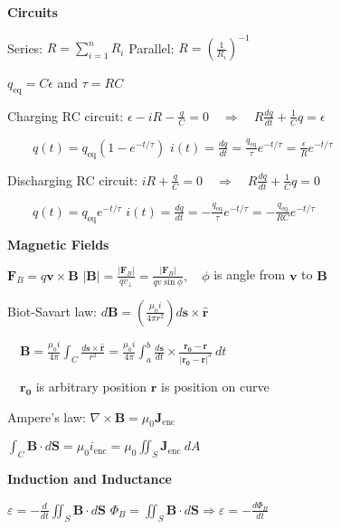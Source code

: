 \documentclass[twocolumn]{article}
\begin{document}
\textbf{Circuits}

Series: $R = \sum_{i=1}^n R_i$ \hfill Parallel: $R = \left( \frac{1}{R_i} \right)^{-1}$

$q_{\text{eq}} = C \epsilon$ and $\tau = RC$

Charging RC circuit: $\epsilon - iR - \frac{q}{C} = 0 \hspace{1em} \Longrightarrow \hspace{1em} R \frac{dq}{dt} + \frac{1}{C} q = \epsilon$

$\quad\quad q(t) = q_{\text{eq}} (1-e^{-t/\tau})$ \hfill $i(t) = \frac{dq}{dt} = \frac{q_{\text{eq}}}{\tau} e^{-t/\tau} = \frac{\epsilon}{R} e^{-t/\tau}$

Discharging RC circuit: $iR + \frac{q}{C} = 0 \hspace{1em} \Longrightarrow \hspace{1em} R \frac{dq}{dt} + \frac{1}{C} q = 0$

$\quad\quad q(t) = q_{\text{eq}} e^{-t/\tau}$ \hfill $i(t) = \frac{dq}{dt} = -\frac{q_{\text{eq}}}{\tau} e^{-t/\tau} = -\frac{q_{\text{eq}}}{RC} e^{-t/\tau}$

\dotfill

\textbf{Magnetic Fields}

$\mathbf{F}_B = q \mathbf{v} \times \mathbf{B}$ \hfill $|\mathbf{B}| = \frac{|\mathbf{F}_B|}{q v_\perp} = \frac{|\mathbf{F}_B|}{qv \sin \phi}, \quad \phi$ is angle from $\mathbf{v}$ to $\mathbf{B}$

Biot-Savart law: $d\mathbf{B} = \left( \frac{\mu_0 i}{4 \pi r^2} \right) d\mathbf{s} \times \mathbf{\hat{r}}$

$\quad \mathbf{B} = \frac{\mu_0 i}{4 \pi} \int_C \frac{d\mathbf{s} \times \mathbf{\hat{r}}}{r^2} = \frac{\mu_0 i}{4 \pi} \int_a^b \frac{d\mathbf{s}}{dt} \times \frac{\mathbf{r_0} - \mathbf{r}}{|\mathbf{r_0} - \mathbf{r}|^3}\ dt$

$\quad \mathbf{r_0}$ is arbitrary position \hfill $\mathbf{r}$ is position on curve

Ampere's law: $\nabla \times \mathbf{B} = \mu_0 \mathbf{J}_{\text{enc}}$

$\int_C \mathbf{B} \cdot d\mathbf{S} = \mu_0 i_{\text{enc}} = \mu_0 \iint_S \mathbf{J}_{\text{enc}}\ dA$

\dotfill

\textbf{Induction and Inductance}

$\varepsilon = - \frac{d}{dt} \iint_S \mathbf{B} \cdot d\mathbf{S}$ \hfill $\Phi_B = \iint_S \mathbf{B} \cdot d\mathbf{S} \Longrightarrow \varepsilon = -\frac{d\Phi_B}{dt}$
\end{document}
